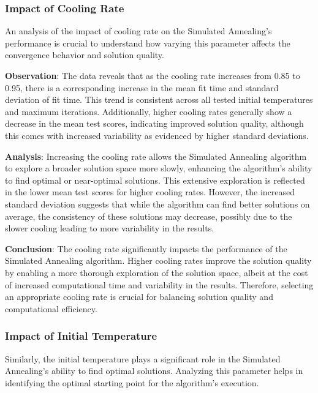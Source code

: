 \documentclass{article}
\begin{document}
    \subsubsection{Impact of Cooling Rate}

    An analysis of the impact of cooling rate on the Simulated Annealing’s performance is crucial to understand how varying this parameter affects the convergence behavior and solution quality.

    \textbf{Observation}: The data reveals that as the cooling rate increases from 0.85 to 0.95, there is a corresponding increase in the mean fit time and standard deviation of fit time. This trend is consistent across all tested initial temperatures and maximum iterations. Additionally, higher cooling rates generally show a decrease in the mean test scores, indicating improved solution quality, although this comes with increased variability as evidenced by higher standard deviations.

    \textbf{Analysis}: Increasing the cooling rate allows the Simulated Annealing algorithm to explore a broader solution space more slowly, enhancing the algorithm's ability to find optimal or near-optimal solutions. This extensive exploration is reflected in the lower mean test scores for higher cooling rates. However, the increased standard deviation suggests that while the algorithm can find better solutions on average, the consistency of these solutions may decrease, possibly due to the slower cooling leading to more variability in the results.

    \textbf{Conclusion}: The cooling rate significantly impacts the performance of the Simulated Annealing algorithm. Higher cooling rates improve the solution quality by enabling a more thorough exploration of the solution space, albeit at the cost of increased computational time and variability in the results. Therefore, selecting an appropriate cooling rate is crucial for balancing solution quality and computational efficiency.

    \subsubsection{Impact of Initial Temperature}

    Similarly, the initial temperature plays a significant role in the Simulated Annealing’s ability to find optimal solutions. Analyzing this parameter helps in identifying the optimal starting point for the algorithm’s execution.
\end{document}
